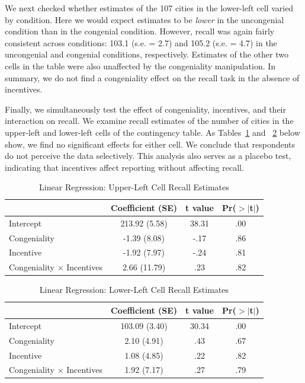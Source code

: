 \documentclass[12pt, letterpaper]{article}
\begin{document}
We next checked whether estimates of the 107 cities in the lower-left cell varied by condition. Here we would expect estimates to be {\it lower} in the uncongenial condition than in the congenial condition. However, recall was again fairly consistent across conditions: 103.1 (s.e. = 2.7) and 105.2 (s.e. = 4.7) in the uncongenial and congenial conditions, respectively. Estimates of the other two cells in the table were also unaffected by the congeniality manipulation. In summary, we do not find a congeniality effect on the recall task in the absence of incentives.

Finally, we simultaneously test the effect of congeniality, incentives, and their interaction on recall. We examine recall estimates of the number of cities in the upper-left and lower-left cells of the contingency table. As Tables~\ref{tab:recalla} and ~\ref{tab:recallc} below show, we find no significant effects for either cell. We conclude that respondents do not perceive the data selectively. This analysis also serves as a placebo test, indicating that incentives affect reporting without affecting recall.

\begin{table}[ht]
\centering
\caption{Linear Regression: Upper-Left Cell Recall Estimates} \label{tab:recalla}
\begin{tabular}{l c c c}
  \hline
 & Coefficient (SE) & t value & Pr($>$$|$t$|$) \\ 
  \hline
  Intercept & 213.92 (5.58) & 38.31 & .00 \\ 
  Congeniality & -1.39 (8.08) & -.17 & .86 \\ 
  Incentive & -1.92 (7.97) & -.24 & .81 \\ 
  Congeniality $\times$ Incentives & 2.66 (11.79) & .23 & .82 \\ 
   \hline
\end{tabular}
\end{table}

\begin{table}[ht]
\centering
\caption{Linear Regression: Lower-Left Cell Recall Estimates} \label{tab:recallc}
\begin{tabular}{l c c c}
  \hline
 & Coefficient (SE) & t value & Pr($>$$|$t$|$) \\ 
  \hline
  Intercept & 103.09 (3.40) & 30.34 & .00 \\ 
  Congeniality & 2.10 (4.91) & .43 & .67 \\ 
  Incentive & 1.08 (4.85) & .22 & .82 \\ 
  Congeniality $\times$ Incentives & 1.92 (7.17) & .27 & .79 \\ 
   \hline
\end{tabular}
\end{table}
\end{document}
